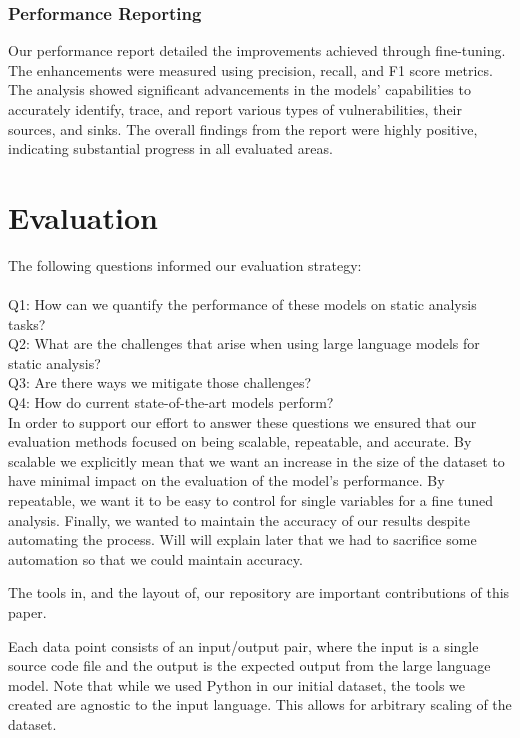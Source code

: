 \documentclass[acmsmall]{acmart}
\begin{document}
\subsubsection{Performance Reporting}
Our performance report detailed the improvements achieved through fine-tuning. The enhancements were measured using precision, recall, and F1 score metrics. The analysis showed significant advancements in the models' capabilities to accurately identify, trace, and report various types of vulnerabilities, their sources, and sinks. The overall findings from the report were highly positive, indicating substantial progress in all evaluated areas.


\section{Evaluation}
The following questions informed our evaluation strategy:\\
\\
Q1: How can we quantify the performance of these models on static analysis tasks?\\
Q2: What are the challenges that arise when using large language models for static analysis?\\
Q3: Are there ways we mitigate those challenges?\\
Q4: How do current state-of-the-art models perform?\\

In order to support our effort to answer these questions we ensured that our evaluation methods focused on being scalable, repeatable, and accurate. By scalable we explicitly mean that we want an increase in the size of the dataset to have minimal impact on the evaluation of the model's performance. By repeatable, we want it to be easy to control for single variables for a fine tuned analysis. Finally, we wanted to maintain the accuracy of our results despite automating the process. Will will explain later that we had to sacrifice some automation so that we could maintain accuracy.

The tools in, and the layout of, our repository are important contributions of this paper. 

Each data point consists of an input/output pair, where the input is a single source code file and the output is the expected output from the large language model. Note that while we used Python in our initial dataset, the tools we created are agnostic to the input language. This allows for arbitrary scaling of the dataset.
\end{document}
